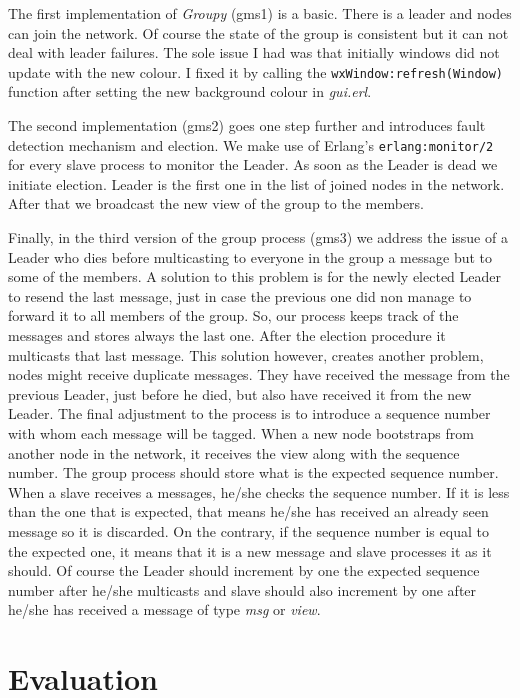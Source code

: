 \documentclass[a4paper, 11pt]{article}
\begin{document}
The first implementation of \emph{Groupy} (gms1) is a basic. There is a leader and
nodes can join the network. Of course the state of the group is consistent but
it can not deal with leader failures. The sole issue I had was that initially windows did not
update with the new colour. I fixed it by calling the \texttt{wxWindow:refresh(Window)}
function after setting the new background colour in \emph{gui.erl}.

The second implementation (gms2) goes one
step further and introduces fault detection mechanism and election. We make
use of Erlang's \texttt{erlang:monitor/2} for every slave process to monitor the Leader. As
soon as the Leader is dead we initiate election. Leader is the first one in the
list of joined nodes in the network. After that we broadcast the new view of the
group to the members.

Finally, in the third version of the group process (gms3)
we address the issue of a Leader who dies before multicasting to everyone
in the group a message but to some of the members. A solution to this problem is
for the newly elected Leader to resend the last message, just in case the
previous one did non manage to forward it to all members of the group. So, our
process keeps track of the messages and stores always the last one. After the
election procedure it multicasts that last message. This solution however,
creates another problem, nodes might receive duplicate messages. They have
received the message from the previous Leader, just before he died, but also
have received it from the new Leader. The final adjustment to the process is to
introduce a sequence number with whom each message will be tagged. When a new
node bootstraps from another node in the network, it receives the view along
with the sequence number. The group process should store what is the expected
sequence number. When a slave receives a messages, he/she checks the sequence
number. If it is less than the one that is expected, that means he/she has received
an already seen message so it is discarded. On the contrary, if the sequence
number is equal to the expected one, it means that it is a new message and
slave processes it as it should. Of course the Leader should increment by one the
expected sequence number after he/she multicasts and slave should also increment
by one after he/she has received a message of type \emph{msg} or \emph{view}.

\section{Evaluation}
\end{document}
